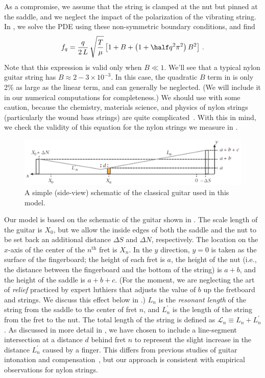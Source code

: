 As a compromise, we assume that the string is clamped at the nut but pinned at the saddle, and we neglect the impact of the polarization of the vibrating string. In , we solve the PDE using these non-symmetric boundary conditions, and find
 \begin{equation} \label{eqn:f_m_stiff}
f_q = \frac{q}{2\, L}\, \sqrt{\frac{T}{\mu}} \left[ 1 + B + \left( 1 + \half q^2 \pi^2 \right) B^2 \right]\, .
 \end{equation}
Note that this expression is valid only when $B \ll 1$. We'll see that a typical nylon guitar string has $B \approx 2 - 3 \times 10^{-3}$. In this case, the quadratic $B$ term in  is only 2\% as large as the linear term, and can generally be neglected. (We will include it in our numerical computations for completeness.) We should use  with some caution, because the chemistry, materials science, and physics of nylon strings (particularly the wound bass strings) are quite complicated~\cite{ref:lynchaird2017mpn}. With this in mind, we check the validity of this equation for the nylon strings we measure in .

 \begin{figure}
  \centering
  \includegraphics[width=7.0in]{figures/fretting_schematic}
  \caption{\label{fig:guitar_schematic} A simple (side-view) schematic of the classical guitar used in this model.}
 \end{figure}

Our model is based on the schematic of the guitar shown in . The scale length of the guitar is $X_0$, but we allow the inside edges of both the saddle and the nut to be set back an additional distance $\Delta S$ and $\Delta N$, respectively. The location on the $x$-axis of the center of the $n^\textrm{th}$ fret is $X_n$. In the $y$ direction, $y = 0$ is taken as the surface of the fingerboard; the height of each fret is $a$, the height of the nut (i.e., the distance between the fingerboard and the bottom of the string) is $a + b$, and the height of the saddle is $a + b + c$. (For the moment, we are neglecting the art of \emph{relief} practiced by expert luthiers that adjusts the value of $b$ up the fretboard and strings. We discuss this effect below in .) $L_n$ is the \emph{resonant length} of the string from the saddle to the center of fret $n$, and $L^\prime_n$ is the length of the string from the fret to the nut. The total length of the string is defined as $\mathcal{L}_n \equiv L_n + L^\prime_n$. As discussed in more detail in , we have chosen to include a line-segment intersection at a distance $d$ behind fret $n$ to represent the slight increase in the distance $L_n^\prime$ caused by a finger. This differs from previous studies of guitar intonation and compensation~\cite{ref:byers1996cgi,ref:varieschi2010icf}, but our approach is consistent with empirical observations for nylon strings.

